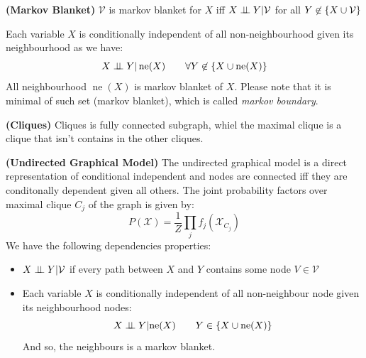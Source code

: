 \begin{definition}{\textbf{(Markov Blanket)}}
    $\mathcal{V}$ is markov blanket for $X$ iff $X\perp \!\!\! \perp Y | \mathcal{V}$ for all $Y\not\in\left\{ X\cup\mathcal{V} \right\}$
\end{definition}

\begin{remark}
    Each variable $X$ is conditionally independent of all non-neighbourhood given its neighbourhood as we have:
    \begin{equation*}
        X \perp \!\!\! \perp Y | \operatorname{ne}(X) \qquad \forall Y \not\in \left\{ X \cup \operatorname{ne}(X) \right\}
    \end{equation*}
    All neighbourhood $\operatorname{ne}(X)$ is markov blanket of $X$. Please note that it is minimal of such set (markov blanket), which is called \emph{markov boundary}. 
\end{remark}

\begin{definition}{\textbf{(Cliques)}}
    Cliques is fully connected subgraph, whiel the maximal clique is a clique that isn't contains in the other cliques. 
\end{definition}

\begin{definition}{\textbf{(Undirected Graphical Model)}}
    The undirected graphical model is a direct representation of conditional independent and nodes are connected iff they are conditonally dependent given all others. The joint probability factors over maximal clique $C_j$ of the graph is given by:
    \begin{equation*}
        P(\mathcal{X}) = \frac{1}{Z}\prod_jf_j(\mathcal{X}_{C_j})
    \end{equation*}
    We have the following dependencies properties:
    \begin{itemize}
        \item $X \perp \!\!\! \perp Y | \mathcal{V}$ if every path between $X$ and $Y$ contains some node $V \in\mathcal{V}$
        \item Each variable $X$ is conditionally independent of all non-neighbour node given its neighbourhood nodes:
        \begin{equation*}
            X\perp \!\!\! \perp Y | \text{ne}(X) \qquad Y \in \left\{ X \cup \operatorname{ne}(X) \right\}
        \end{equation*}
        And so, the neighbours is a markov blanket. 
    \end{itemize}
\end{definition}

